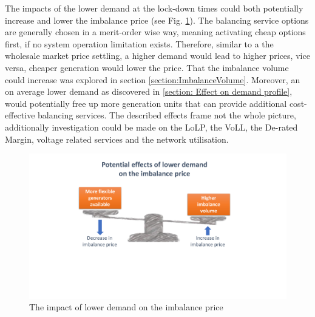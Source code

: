 \documentclass[energies,article,submit,moreauthors,pdftex]{Definitions/mdpi}
\begin{document}
The impacts of the lower demand at the lock-down times could both potentially increase and lower the imbalance price (see Fig. \ref{fig:imbalance-price-trade-off}). The balancing service options are generally chosen in a merit-order wise way, meaning activating cheap options first, if no system operation limitation exists. Therefore, similar to a the wholesale market price settling, a higher demand would lead to higher prices, vice versa, cheaper generation would lower the price. That the imbalance volume could increase was explored in section \ref{section:ImbalanceVolume}. Moreover, an on average lower demand as discovered in \ref{section: Effect on demand profile}, would potentially free up more generation units that can provide additional cost-effective balancing services. The described effects frame not the whole picture, additionally investigation could be made on the LoLP, the VoLL, the De-rated Margin, voltage related services and the network utilisation.

\begin{figure}[H]
\centering
\hspace{-25pt}
\includegraphics[trim={4cm 6.3cm 5cm 1cm},clip,width=1\textwidth]{Graphics/Imbalance-price-trade-off.pdf}
\caption{The impact of lower demand on the imbalance price}
\label{fig:imbalance-price-trade-off}
\end{figure} 



\end{document}
